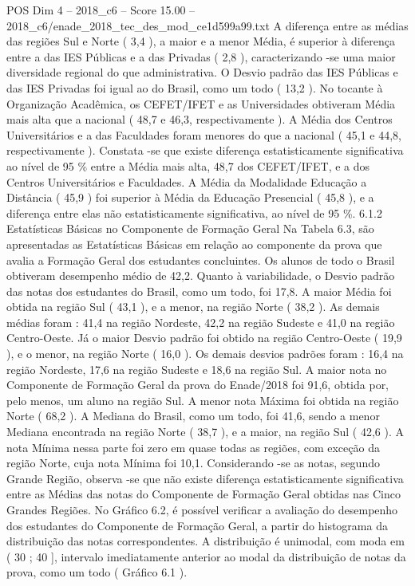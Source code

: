 \begin{textsample}{POS Dim 4 – 2018\_c6 – Score 15.00 – 2018\_c6/enade\_2018\_tec\_des\_mod\_ce1d599a99.txt}
A diferença entre as médias das regiões Sul e Norte ( 3,4 ), a maior e a menor Média, é superior à diferença entre a das IES Públicas e a das Privadas ( 2,8 ), caracterizando -se uma maior diversidade regional do que administrativa.
O Desvio padrão das IES Públicas e das IES Privadas foi igual ao do Brasil, como um todo ( 13,2 ).
No tocante à Organização Acadêmica, os CEFET/IFET e as Universidades obtiveram Média mais alta que a nacional ( 48,7 e 46,3, respectivamente ).
A Média dos Centros Universitários e a das Faculdades foram menores do que a nacional ( 45,1 e 44,8, respectivamente ).
Constata -se que existe diferença estatisticamente significativa ao nível de 95 \% entre a Média mais alta, 48,7 dos CEFET/IFET, e a dos Centros Universitários e Faculdades.
A Média da Modalidade Educação a Distância ( 45,9 ) foi superior à Média da Educação Presencial ( 45,8 ), e a diferença entre elas não estatisticamente significativa, ao nível de 95 \%. 6.1.2 Estatísticas Básicas no Componente de Formação Geral Na Tabela 6.3, são apresentadas as Estatísticas Básicas em relação ao componente da prova que avalia a Formação Geral dos estudantes concluintes.
Os alunos de todo o Brasil obtiveram desempenho médio de 42,2.
Quanto à variabilidade, o Desvio padrão das notas dos estudantes do Brasil, como um todo, foi 17,8.
A maior Média foi obtida na região Sul ( 43,1 ), e a menor, na região Norte ( 38,2 ).
As demais médias foram : 41,4 na região Nordeste, 42,2 na região Sudeste e 41,0 na região Centro-Oeste.
Já o maior Desvio padrão foi obtido na região Centro-Oeste ( 19,9 ), e o menor, na região Norte ( 16,0 ).
Os demais desvios padrões foram : 16,4 na região Nordeste, 17,6 na região Sudeste e 18,6 na região Sul.
A maior nota no Componente de Formação Geral da prova do Enade/2018 foi 91,6, obtida por, pelo menos, um aluno na região Sul.
A menor nota Máxima foi obtida na região Norte ( 68,2 ).
A Mediana do Brasil, como um todo, foi 41,6, sendo a menor Mediana encontrada na região Norte ( 38,7 ), e a maior, na região Sul ( 42,6 ).
A nota Mínima nessa parte foi zero em quase todas as regiões, com exceção da região Norte, cuja nota Mínima foi 10,1.
Considerando -se as notas, segundo Grande Região, observa -se que não existe diferença estatisticamente significativa entre as Médias das notas do Componente de Formação Geral obtidas nas Cinco Grandes Regiões.
No Gráfico 6.2, é possível verificar a avaliação do desempenho dos estudantes do Componente de Formação Geral, a partir do histograma da distribuição das notas correspondentes.
A distribuição é unimodal, com moda em ( 30 ; 40 ], intervalo imediatamente anterior ao modal da distribuição de notas da prova, como um todo ( Gráfico 6.1 ).

\end{textsample}
